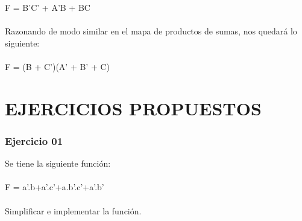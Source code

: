 \documentclass{article}
\begin{document}
                F = B’C’ + A’B + BC\\\\
                Razonando de modo similar en el mapa de productos de sumas, nos quedará lo siguiente:\\\\
                F = (B + C’)(A’ + B’ + C)
    \newpage \part{EJERCICIOS PROPUESTOS}
        \section{\textbf{Ejercicio 01}}
            
            Se tiene la siguiente función:\\\\
            F = a'.b+a'.c'+a.b'.c'+a'.b'\\\\
            Simplificar e implementar la función.
\end{document}
